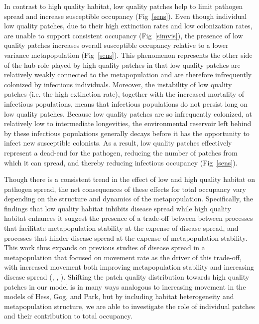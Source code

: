 \documentclass{svjour3}
\begin{document}
In contrast to high quality habitat, low quality patches help to limit pathogen spread and increase susceptible occupancy (Fig~\ref{sens}). Even though individual low quality patches, due to their high extinction rates and low colonization rates, are unable to support consistent occupancy (Fig~\ref{simvis}), the presence of low quality patches increases overall susceptible occupancy relative to a lower variance metapopulation (Fig~\ref{sens}).  This phenomenon represents the other side of the hub role played by high quality patches in that low quality patches are relatively weakly connected to the metapopulation and are therefore infrequently colonized by infectious individuals.  Moreover, the instability of low quality patches (i.e. the high extinction rate), together with the increased mortality of infectious populations, means that infectious populations do not persist long on low quality patches.  Because low quality patches are so infrequently colonized, at relatively low to intermediate longevities, the environmental reservoir left behind by these infectious populations generally decays before it has the opportunity to infect new susceptible colonists.  As a result, low quality patches effectively represent a dead-end for the pathogen, reducing the number of patches from which it can spread, and thereby reducing infectious occupancy (Fig~\ref{sens}). 

Though there is a consistent trend in the effect of low and high quality habitat on pathogen spread, the net consequences of these effects for total occupancy vary depending on the structure and dynamics of the metapopulation.  Specifically, the findings that low quality habitat inhibits disease spread while high quality habitat enhances it suggest the presence of a trade-off between between processes that facilitate metapopulation stability at the expense of disease spread, and processes that hinder disease spread at the expense of metapopulation stability.  This work thus expands on previous studies of disease spread in a metapopulation that focused on movement rate as the driver of this trade-off, with increased movement both improving metapopulation stability and increasing disease spread (\cite{Hess1996}, \cite{Gog2002}, \cite{Park2012}).  Shifting the patch quality distribution towards high quality patches in our model is in many ways analogous to increasing movement in the models of Hess, Gog, and Park, but by including habitat heterogeneity and metapopulation structure, we are able to investigate the role of individual patches and their contribution to total occupancy.
\end{document}
